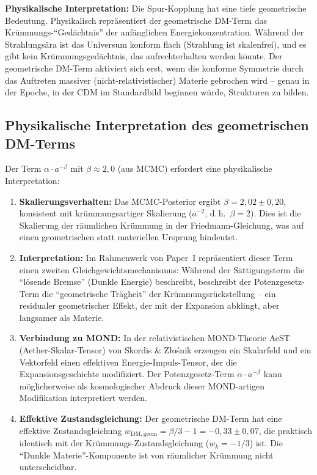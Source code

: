 \documentclass[aps,prd,twocolumn,superscriptaddress,nofootinbib]{revtex4-2}
\begin{document}
\textbf{Physikalische Interpretation:} Die Spur-Kopplung hat eine tiefe geometrische Bedeutung. Physikalisch repr\"asentiert der geometrische DM-Term das Kr\"ummungs-"`Ged\"achtnis"' der anf\"anglichen Energiekonzentration. W\"ahrend der Strahlungs\"ara ist das Universum konform flach (Strahlung ist skalenfrei), und es gibt kein Kr\"ummungsged\"achtnis, das aufrechterhalten werden k\"onnte. Der geometrische DM-Term aktiviert sich erst, wenn die konforme Symmetrie durch das Auftreten massiver (nicht-relativistischer) Materie gebrochen wird -- genau in der Epoche, in der CDM im Standardbild beginnen w\"urde, Strukturen zu bilden.

\subsection{Physikalische Interpretation des geometrischen DM-Terms}

Der Term $\alpha \cdot a^{-\beta}$ mit $\beta \approx 2{,}0$ (aus MCMC) erfordert eine physikalische Interpretation:

\begin{enumerate}
\item \textbf{Skalierungsverhalten:} Das MCMC-Posterior ergibt $\beta = 2{,}02 \pm 0{,}20$, konsistent mit kr\"ummungsartiger Skalierung ($a^{-2}$, d.\,h.\ $\beta = 2$). Dies ist die Skalierung der r\"aumlichen Kr\"ummung in der Friedmann-Gleichung, was auf einen geometrischen statt materiellen Ursprung hindeutet.

\item \textbf{Interpretation:} Im Rahmenwerk von Paper~I repr\"asentiert dieser Term einen zweiten Gleichgewichtsmechanismus: W\"ahrend der S\"attigungsterm die "`l\"osende Bremse"' (Dunkle Energie) beschreibt, beschreibt der Potenzgesetz-Term die "`geometrische Tr\"agheit"' der Kr\"ummungsr\"uckstellung -- ein residualer geometrischer Effekt, der mit der Expansion abklingt, aber langsamer als Materie.

\item \textbf{Verbindung zu MOND:} In der relativistischen MOND-Theorie AeST (Aether-Skalar-Tensor) von Skordis \& Z{\l}o\'snik \cite{Skordis2021} erzeugen ein Skalarfeld und ein Vektorfeld einen effektiven Energie-Impuls-Tensor, der die Expansionsgeschichte modifiziert. Der Potenzgesetz-Term $\alpha \cdot a^{-\beta}$ kann m\"oglicherweise als kosmologischer Abdruck dieser MOND-artigen Modifikation interpretiert werden.

\item \textbf{Effektive Zustandsgleichung:} Der geometrische DM-Term hat eine effektive Zustandsgleichung $w_{\mathrm{DM,geom}} = \beta/3 - 1 = -0{,}33 \pm 0{,}07$, die praktisch identisch mit der Kr\"ummungs-Zustandsgleichung ($w_k = -1/3$) ist. Die "`Dunkle Materie"'-Komponente ist von r\"aumlicher Kr\"ummung nicht unterscheidbar.
\end{enumerate}
\end{document}
